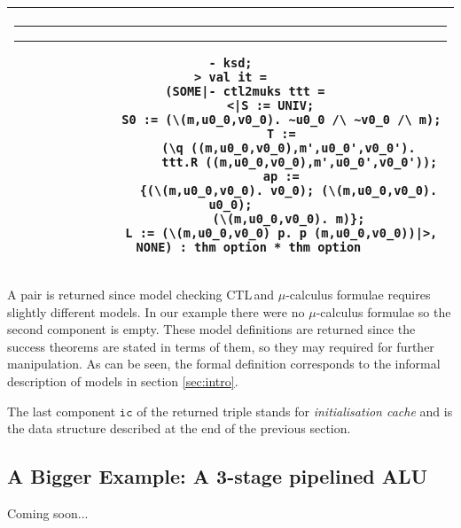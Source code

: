 \documentclass{article}
\makeatletter
\newcommand{\ctl}{\textsf{CTL}\,}
\newlength{\hsbw}
\newcounter{sessioncount}
\newcommand\MLSpacing{13pt}
\newenvironment{session}{\begin{flushleft}
 \begin{tabular}{@{}|c@{}|@{}}\hline 
 \begin{minipage}[b]{\hsbw}
 \vspace*{-.5pt}
 \begin{flushright}
 \rule{0.01in}{.15in}\rule{0.3in}{0.01in}\hspace{-0.35in}
 \raisebox{0.04in}{\makebox[0.3in][c]{\footnotesize\sl \thesessioncount}}
 \end{flushright}
 \vspace*{-.45in}
 \begingroup\small\baselineskip\MLSpacing}{\endgroup\end{minipage}\\ \hline 
 \end{tabular}
 \end{flushleft}
 \stepcounter{sessioncount}}
\makeatother
\begin{document}
\begin{session}\begin{verbatim}
- ksd;
> val it =
    (SOME|- ctl2muks ttt =
            <|S := UNIV; 
              S0 := (\(m,u0_0,v0_0). ~u0_0 /\ ~v0_0 /\ m);
              T :=
                (\q ((m,u0_0,v0_0),m',u0_0',v0_0').
                   ttt.R ((m,u0_0,v0_0),m',u0_0',v0_0'));
              ap :=
                {(\(m,u0_0,v0_0). v0_0); (\(m,u0_0,v0_0). u0_0);
                 (\(m,u0_0,v0_0). m)}; 
              L := (\(m,u0_0,v0_0) p. p (m,u0_0,v0_0))|>,
     NONE) : thm option * thm option
\end{verbatim}\end{session}

A pair is returned since model checking \ctl and \(\mu\)-calculus formulae requires slightly different models. In our example there were no \(\mu\)-calculus formulae so the second component is empty. These model definitions are returned since the success theorems are stated in terms of them, so they may required for further manipulation. As can be seen, the formal definition corresponds to the informal description of models in section \ref{sec:intro}.

The last component \(\mathtt{ic}\) of the returned triple stands for \emph{initialisation cache} and is the data structure described at the end of the previous section. 
 
\subsection{A Bigger Example: A 3-stage pipelined ALU}

Coming soon...


\end{document}
